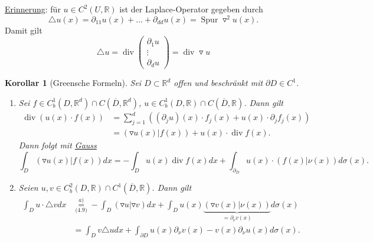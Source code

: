 \documentclass[a4paper]{report}
\newcommand{\R}{\mathbb{R}}
\newcommand{\overunderset}[3]{\overset{#1}{\underset{#3}{#2}}}
\newcommand{\jlabel}[1]{\label{j_#1}}
\newcommand{\jshortlink}[1]{\jhyperref{#1}{\text{#1}}}
\newcommand{\jhyperref}[2]{\hyperref[j_#1]{#2}}
\newcommand{\jlink}[1]{\jhyperref{#1}{#1}}
\newcommand{\Spur}{\mathop{\mathrm{{Spur}}}}
\renewcommand{\div}{\mathop{\mathrm{{div}}}}
\theoremstyle{plain}
\newtheorem{kor}[thm]{Korollar}
\theoremstyle{definition}
\begin{document}
{{{{\uline{Erinnerung}: für $u\in C^2(U,\R)$ ist der Laplace-Operator gegeben durch
\[
    \triangle u(x) = \partial_{11} u(x) + \dots + \partial_{dd} u(x) = \Spur \triangledown^2 u(x).
\]
Damit gilt
\begin{equation}
    \jlabel{(4.9)}
    \triangle u = \div \begin{pmatrix}
                           \partial_1 u\\
                           \vdots\\
                           \partial_d u
                       \end{pmatrix} = \div \triangledown u
\end{equation}


\begin{kor}[Greensche Formeln]
    \jlabel{Kor 4.19}
    \jlabel{Green}
    Sei $D\subset \R^d$ offen und beschränkt mit $\partial D\in C^1$.
    \begin{enumerate}
        \item 
            \jlabel{Kor 4.19.a)}
            Sei $f\in C_b^1(D,\R^d)\cap C(\overline{D}, \R^d)$, $u \in C_b^1(D,\R)\cap C(\overline{D},\R)$. Dann gilt
            \[
                \begin{split}
                    \div (u(x)\cdot f(x)) &= \sum_{j=1}^d \left((\partial_j u)(x)\cdot f_j(x) + u(x)\cdot \partial_j f_j(x) \right)\\
                                          &= \left(\triangledown u(x)|f(x) \right) + u(x)\cdot \div f(x).
                \end{split}
            \]
            Dann folgt mit \jlink{Gauss}
            \[
                \int_D (\triangledown u(x)|f(x)) dx = -\int_D u(x) \div f(x) dx + \int_{\partial_D} u(x)\cdot (f(x)|\nu(x))d\sigma(x).
            \]

        \item
            \jlabel{Kor 4.19.b)}
            Seien $u,v\in C_b^2(D,\R) \cap C^1(\overline{D},\R)$. Dann gilt
            \[
                \begin{split}
                    \int_D u\cdot\triangle v dx &\overunderset{a)}{=}{\jshortlink{(4.9)}} -\int_D (\triangledown u | \triangledown v) dx + \int_D u(x)\underbrace{(\triangledown v(x)| \nu(x))}_{=\partial_\nu v(x)} d\sigma(x)\\
                    &=\int_D v \triangle u dx + \int_{\partial D} u(x)\partial_\nu v(x) - v(x)\partial_\nu u(x) d\sigma(x).
                \end{split}
            \]
    \end{enumerate}
\end{kor}

}}}}
\end{document}
